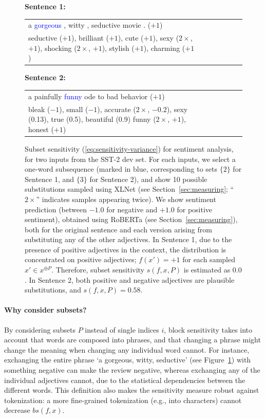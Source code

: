 \documentclass[11pt,a4paper]{article}
\begin{document}
\begin{figure}
\textbf{Sentence 1:}

\begin{tabular}{lllllll} 
a  \textcolor{blue}{gorgeous} , witty , seductive  movie . ($+1$) \\
\small{seductive ($+1$), brilliant ($+1$), cute ($+1$), sexy ($2\times$, $+1$), shocking ($2\times$, $+1$), stylish ($+1$), charming ($+1$)}
\end{tabular}
        
\textbf{Sentence 2:}

\begin{tabular}{lllllll} 
a painfully \textcolor{blue}{funny}  ode to  bad behavior ($+1$)\\
	\small{bleak ($-1$), small ($-1$), accurate ($2\times$, $-0.2$), sexy (0.13), true (0.5), beautiful (0.9) funny ($2\times$, $+1$), honest ($+1$) }
\end{tabular}
        
  \caption{Subset sensitivity (\ref{eq:sensitivity-variance}) for sentiment analysis, for two inputs from the SST-2 dev set. For each inputs, we select a one-word subsequence (marked in blue, corresponding to sets $\{2\}$ for Sentence 1, and $\{3\}$ for Sentence 2), and show 10 possible substitutions sampled using XLNet  (see Section~\ref{sec:measuring}; ``$2\times$'' indicates samples appearing twice).
  We show sentiment prediction (between $-1.0$ for negative and $+1.0$ for positive sentiment), obtained using  RoBERTa  (see Section~\ref{sec:measuring}), both for the original sentence and each version arising from substituting any of the other adjectives.
  In Sentence 1, due to the presence of positive adjectives in the context, the distribution is concentrated on positive adjectives; $f(x') = +1$ for each sampled $x' \in x^{\oplus P}$. Therefore, subset sensitivity $s(f,x,P)$ is estimated as $0.0$.
In Sentence 2, both positive and negative adjectives are plausible substitutions, and $s(f,x,P) = 0.58$.}\label{fig:sensitivity-single-sentiment}
\end{figure}



\paragraph{Why consider subsets?}
By considering subsets $P$ instead of single indices $i$, block sensitivity takes into account that words are composed into phrases, and that changing a phrase might change the meaning when changing any individual word cannot.
For instance, exchanging the entire phrase `a gorgeous, witty, seductive' (see Figure~\ref{fig:sensitivity-single-sentiment}) with something negative can make the review negative, whereas exchanging any of the individual adjectives cannot, due to the statistical dependencies between the different words. 
This definition also makes the sensitivity measure robust against tokenization: a more fine-grained tokenization (e.g., into characters) cannot decrease $bs(f,x)$.
\end{document}
